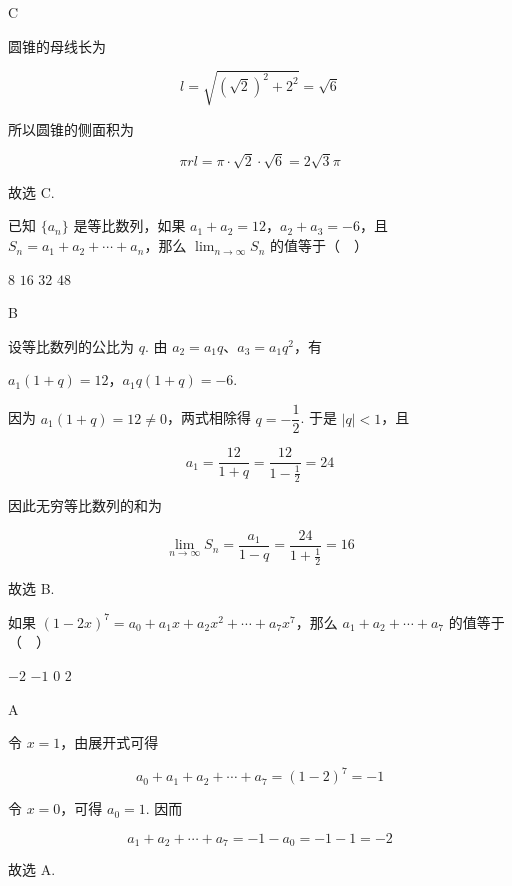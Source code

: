\begin{answer}
C
\end{answer}

\begin{solution}
圆锥的母线长为

\[l=\sqrt{\left(\sqrt{2}\right)^2+2^2}=\sqrt{6}\]

所以圆锥的侧面积为

\[\pi rl=\pi\cdot\sqrt{2}\cdot\sqrt{6}=2\sqrt{3}\pi\]

故选 C.
\end{solution}

\begin{problem}
已知 \(\{a_n\}\) 是等比数列，如果 \(a_1 + a_2 = 12\)，\(a_2 + a_3 = -6\)，且 \(S_n = a_1 + a_2 + \cdots + a_n\)，那么 \(\displaystyle\lim_{n \to \infty} S_n\) 的值等于（\(\quad\)）

\choices
    {\(8\)}
    {\(16\)}
    {\(32\)}
    {\(48\)}
\end{problem}

\begin{answer}
B
\end{answer}

\begin{solution}
设等比数列的公比为 \(q\). 由 \(a_2=a_1q\)、\(a_3=a_1q^2\)，有

\(a_1(1+q)=12\)，\(a_1q(1+q)=-6\).

因为 \(a_1(1+q)=12\neq0\)，两式相除得 \(q=-\dfrac12\). 于是 \(|q|<1\)，且

\[a_1=\frac{12}{1+q}=\frac{12}{1-\frac12}=24\]

因此无穷等比数列的和为

\[\lim_{n\to\infty}S_n=\frac{a_1}{1-q}=\frac{24}{1+\frac12}=16\]

故选 B.
\end{solution}

\begin{problem}
如果 \((1 - 2x)^7 = a_0 + a_1x + a_2x^2 + \cdots + a_7x^7\)，那么 \(a_1 + a_2 + \cdots + a_7\) 的值等于（\(\quad\)）

\choices
    {\(-2\)}
    {\(-1\)}
    {\(0\)}
    {\(2\)}
\end{problem}

\begin{answer}
A
\end{answer}

\begin{solution}
令 \(x=1\)，由展开式可得

\[a_0+a_1+a_2+\cdots+a_7=(1-2)^7=-1\]

令 \(x=0\)，可得 \(a_0=1\). 因而

\[a_1+a_2+\cdots+a_7=-1-a_0=-1-1=-2\]

故选 A.
\end{solution}

